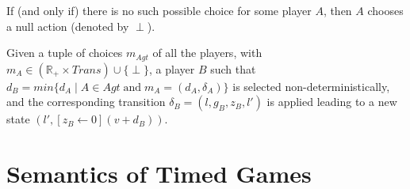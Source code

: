 If (and only if) there is no such possible choice for some player $A$, then $A$ chooses a null action (denoted by $\perp$).

Given a tuple of choices $m_{Agt}$ of all the players, with $m_{A} \in (\mathbb{R}_{+} \times Trans) \cup \lbrace \perp \rbrace$, a player $B$ such that $d_{B} = min\lbrace d_{A} \; \vert \; A \in Agt \; \text{and} \; m_{A} = (d_{A}, \delta_{A}) \rbrace$ is selected non-deterministically, and the corresponding transition $\delta_{B} = (l, g_{B}, z_{B}, l')$ is applied leading to a new state $(l', [z_{B} \leftarrow 0](v + d_{B}))$.

\section{Semantics of Timed Games}

